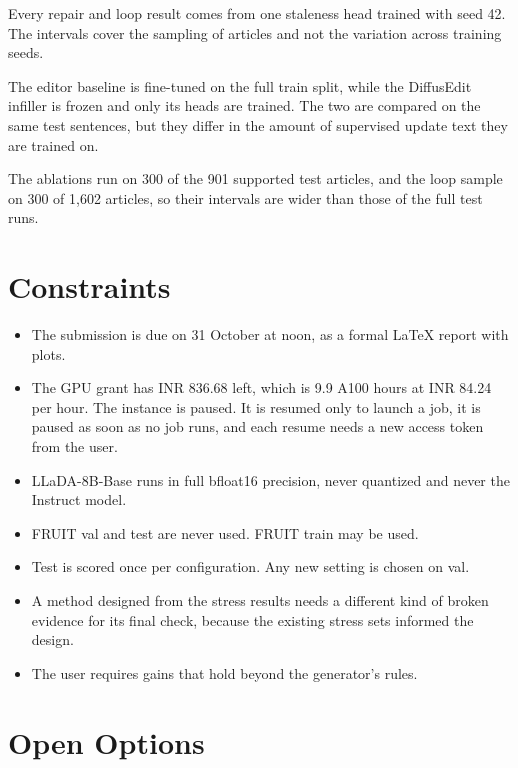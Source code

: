\documentclass[]{paper}
\begin{document}
Every repair and loop result comes from one staleness head trained with seed 42. The intervals cover the sampling of articles and not the variation across training seeds.

The editor baseline is fine-tuned on the full train split, while the DiffusEdit infiller is frozen and only its heads are trained. The two are compared on the same test sentences, but they differ in the amount of supervised update text they are trained on.

The ablations run on 300 of the 901 supported test articles, and the loop sample on 300 of 1,602 articles, so their intervals are wider than those of the full test runs.

\section{Constraints}

\begin{itemize}
\item The submission is due on 31 October at noon, as a formal LaTeX report with plots.
\item The GPU grant has INR 836.68 left, which is 9.9 A100 hours at INR 84.24 per hour. The instance is paused. It is resumed only to launch a job, it is paused as soon as no job runs, and each resume needs a new access token from the user.
\item LLaDA-8B-Base runs in full bfloat16 precision, never quantized and never the Instruct model.
\item FRUIT val and test are never used. FRUIT train may be used.
\item Test is scored once per configuration. Any new setting is chosen on val.
\item A method designed from the stress results needs a different kind of broken evidence for its final check, because the existing stress sets informed the design.
\item The user requires gains that hold beyond the generator's rules.
\end{itemize}

\section{Open Options}
\end{document}
